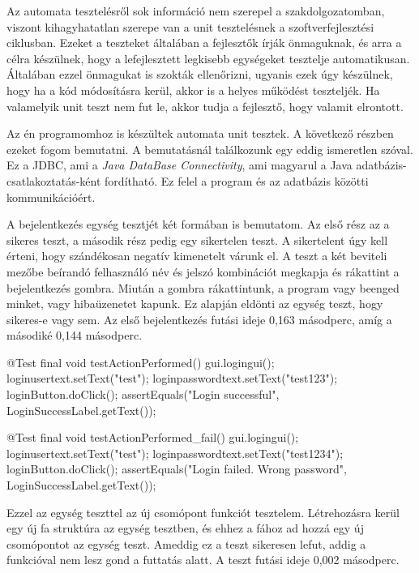 
Az automata tesztelésről sok információ nem szerepel a szakdolgozatomban, viszont kihagyhatatlan szerepe van a unit tesztelésnek a szoftverfejlesztési ciklusban. Ezeket a teszteket általában a fejlesztők írják önmaguknak, és arra a célra készülnek, hogy a lefejlesztett legkisebb egységeket tesztelje automatikusan. Általában ezzel önmagukat is szokták ellenőrizni, ugyanis ezek úgy készülnek, hogy ha a kód módosításra kerül, akkor is a helyes működést teszteljék. Ha valamelyik unit teszt nem fut le, akkor tudja a fejlesztő, hogy valamit elrontott.

Az én programomhoz is készültek automata unit tesztek. A következő részben ezeket fogom bemutatni. A bemutatásnál találkozunk egy eddig ismeretlen szóval. Ez a JDBC, ami a \textit{Java DataBase Connectivity}, ami magyarul a Java adatbázis-csatlakoztatás-ként fordítható. Ez felel a program és az adatbázis közötti kommunikációért.


A bejelentkezés egység tesztjét két formában is bemutatom. Az első rész az a sikeres teszt, a második rész pedig egy sikertelen teszt. A sikertelent úgy kell érteni, hogy szándékosan negatív kimenetelt várunk el. A teszt a két beviteli mezőbe beírandó felhasználó név és jelszó kombinációt megkapja és rákattint a bejelentkezés gombra. Miután a gombra rákattintunk, a program vagy beenged minket, vagy hibaüzenetet kapunk. Ez alapján eldönti az egység teszt, hogy sikeres-e vagy sem. Az első bejelentkezés futási ideje 0,163 másodperc, amíg a másodiké 0,144 másodperc.

\begin{java}
@Test
final void testActionPerformed() {
	gui.logingui();
	loginusertext.setText("test");
	loginpasswordtext.setText("test123");
	loginButton.doClick();
	assertEquals("Login successful",
	LoginSuccessLabel.getText());
}

@Test
final void testActionPerformed_fail() {
	gui.logingui();
	loginusertext.setText("test");
	loginpasswordtext.setText("test1234");
	loginButton.doClick();
	assertEquals("Login failed. Wrong password",
	LoginSuccessLabel.getText());
}	
\end{java}


Ezzel az egység teszttel az új csomópont funkciót tesztelem. Létrehozásra kerül egy új fa struktúra az egység tesztben, és ehhez a fához ad hozzá egy új csomópontot az egység teszt. Ameddig ez a teszt sikeresen lefut, addig a funkcióval nem lesz gond a futtatás alatt. A teszt futási ideje 0,002 másodperc.

